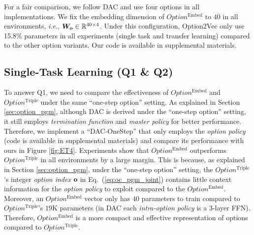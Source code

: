 \documentclass{article}
\begin{document}
For a fair comparison, we follow DAC and use four options in all
implementations. We fix the embedding dimension of
$Option^{\textrm{Embed}}$ to $40$ in all environments, \textit{i.e.},
${\bm{W}}_{{\mathbf{o}}}\in {\mathbb{R}}^{40\times 4}$. Under this configuration,
Option2Vec only use 15.8\% parameters in all experiments (single
task and transfer learning) compared to the other option
variants. Our code is available in supplemental materials.

\vspace{-3mm}\subsection{Single-Task Learning (Q1 \& Q2)}
\label{sec:exp_perf}
\vspace{-2mm}
To answer Q1, we need to compare the effectiveness of
$Option^{\textrm{Embed}}$ and $Option^{\textrm{Triple}}$ under the same ``one-step
option'' setting. As explained in Section \ref{sec:option_pgm},
although DAC is derived under the ``one-step option'' setting, it still employs \emph{termination
  function} and \emph{master policy} for better performance. Therefore, we
implement a ``DAC-OneStep'' that only employs the \emph{option policy} (code is available in supplemental
materials) and compare its performance with ours in Figure
\ref{fig:ET4}. Experiments show that $Option^{\textrm{Embed}}$
outperforms $Option^{\textrm{Triple}}$ in all environments by a
large margin. This is because, as explained in Section
\ref{sec:option_pgm}, under the ``one-step option'' setting, the
$Option^{\textrm{Triple}}$'s integer \emph{option index} ${\mathbf{o}}$
in Eq.~(\ref{eq:oc_pgm_joint}) contains little context information for the \emph{option policy}
to exploit compared to the $Option^{\textrm{Embed}}$. Moreover,
an $Option^{\textrm{Embed}}$ vector only has $40$ parameters to
train compared to $Option^{\textrm{Triple}}$'s $19$K parameters
(in DAC each \emph{intra-option policy} is a 3-layer FFN). Therefore, $Option^{\textrm{Embed}}$ is a more compact and
effective representation of options compared to
$Option^{\textrm{Triple}}$.
\end{document}
